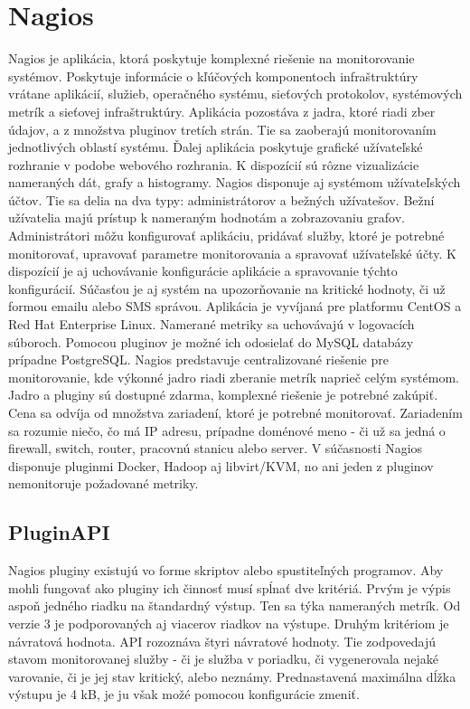 \documentclass[11pt,final,oneside]{fithesis}
\begin{document}
\section{Nagios}
Nagios je aplikácia, ktorá poskytuje komplexné riešenie na monitorovanie systémov. Poskytuje informácie o kľúčových komponentoch infraštruktúry vrátane aplikácií, služieb, operačného systému, sieťových protokolov, systémových metrík
a sieťovej infraštruktúry. \cite{19} Aplikácia pozostáva z jadra, ktoré riadi zber údajov, a z množstva pluginov tretích strán. Tie sa zaoberajú monitorovaním jednotlivých oblastí systému. Ďalej aplikácia
poskytuje grafické užívateľské rozhranie v podobe webového rozhrania. K dispozícií sú rôzne vizualizácie nameraných dát, grafy a histogramy. Nagios disponuje aj systémom užívateľských účtov. Tie sa delia na dva typy: 
administrátorov a bežných užívatešov. Bežní užívatelia majú prístup k nameraným hodnotám a zobrazovaniu grafov. Administrátori môžu konfigurovať aplikáciu, pridávať služby, ktoré je potrebné monitorovať,
 upravovať parametre monitorovania a spravovať užívateľské účty. K dispozícií je aj uchovávanie konfigurácie aplikácie a spravovanie týchto konfigurácií. Súčasťou je aj systém na upozorňovanie na kritické
 hodnoty, či už formou emailu alebo SMS správou. Aplikácia je vyvíjaná pre platformu CentOS a Red Hat Enterprise Linux. Namerané metriky sa uchovávajú v logovacích súboroch. 
 Pomocou pluginov je možné ich odosielať do MySQL databázy prípadne PostgreSQL. Nagios predstavuje centralizované riešenie pre  monitorovanie, kde výkonné jadro riadi zberanie metrík naprieč celým systémom. 
 Jadro a pluginy sú dostupné zdarma, komplexné riešenie je potrebné zakúpiť. Cena sa odvíja od množstva zariadení, ktoré je potrebné monitorovať. Zariadením sa rozumie niečo, čo má IP adresu, 
 prípadne doménové meno - či už sa jedná o firewall, switch, router, pracovnú stanicu alebo server. V súčasnosti Nagios disponuje pluginmi Docker, Hadoop aj libvirt/KVM, no ani jeden z pluginov 
 nemonitoruje požadované metriky.

\subsection{PluginAPI}
Nagios pluginy existujú vo forme skriptov alebo spustiteľných programov. Aby mohli fungovať ako pluginy ich činnosť musí spĺnať dve kritériá. Prvým je výpis aspoň jedného riadku na štandardný výstup.
Ten sa týka nameraných metrík. Od verzie 3 je podporovaných aj viacerov riadkov na výstupe. Druhým kritériom je návratová hodnota.
API rozoznáva štyri návratové hodnoty. Tie zodpovedajú stavom monitorovanej služby - či je služba v poriadku, či vygenerovala nejaké varovanie, či je jej stav kritický, alebo neznámy. Prednastavená maximálna dĺžka 
výstupu je 4 kB, je ju však možé pomocou konfigurácie zmeniť.
\end{document}
